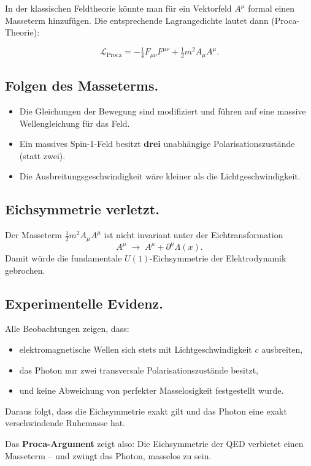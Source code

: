 In der klassischen Feldtheorie könnte man für ein Vektorfeld \( A^\mu \) 
formal einen Masseterm hinzufügen. Die entsprechende Lagrangedichte 
lautet dann (Proca-Theorie):

\[
\mathcal{L}_{\text{Proca}} = -\tfrac{1}{4} F_{\mu\nu} F^{\mu\nu} 
+ \tfrac{1}{2} m^2 A_\mu A^\mu .
\]

\subsection*{Folgen des Masseterms.}
\begin{itemize}
	\item Die Gleichungen der Bewegung sind modifiziert und führen 
	auf eine massive Wellengleichung für das Feld.
	\item Ein massives Spin-1-Feld besitzt \textbf{drei} unabhängige 
	Polarisationszustände (statt zwei).
	\item Die Ausbreitungsgeschwindigkeit wäre kleiner als die Lichtgeschwindigkeit.
\end{itemize}

\subsection*{Eichsymmetrie verletzt.}
Der Masseterm \( \tfrac{1}{2} m^2 A_\mu A^\mu \) 
ist nicht invariant unter der Eichtransformation
\[
A^\mu \;\to\; A^\mu + \partial^\mu \Lambda(x).
\]
Damit würde die fundamentale \(U(1)\)-Eichsymmetrie der Elektrodynamik gebrochen.

\subsection*{Experimentelle Evidenz.}
Alle Beobachtungen zeigen, dass:
\begin{itemize}
	\item elektromagnetische Wellen sich stets mit Lichtgeschwindigkeit \(c\) ausbreiten,
	\item das Photon nur zwei transversale Polarisationszustände besitzt,
	\item und keine Abweichung von perfekter Masselosigkeit festgestellt wurde.
\end{itemize}
Daraus folgt, dass die Eichsymmetrie exakt gilt 
und das Photon eine exakt verschwindende Ruhemasse hat.

\medskip
Das \textbf{Proca-Argument} zeigt also:  
Die Eichsymmetrie der QED verbietet einen Masseterm – 
und zwingt das Photon, masselos zu sein.
